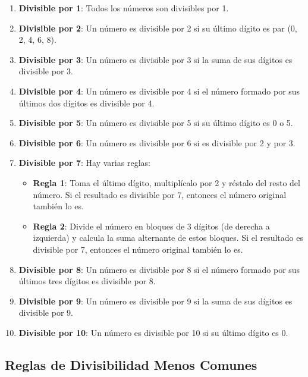 \begin{enumerate}
	\item \textbf{Divisible por 1}: Todos los números son divisibles por 1.
	\item \textbf{Divisible por 2}: Un número es divisible por 2 si su último dígito es par (0, 2, 4, 6, 8).
	\item \textbf{Divisible por 3}: Un número es divisible por 3 si la suma de sus dígitos es divisible por 3.
	\item \textbf{Divisible por 4}: Un número es divisible por 4 si el número formado por sus últimos dos dígitos es divisible por 4.
	\item \textbf{Divisible por 5}: Un número es divisible por 5 si su último dígito es 0 o 5.
	\item \textbf{Divisible por 6}: Un número es divisible por 6 si es divisible por 2 y por 3.
	\item \textbf{Divisible por 7}: Hay varias reglas:
	\begin{itemize}
		\item \textbf{Regla 1}: Toma el último dígito, multiplícalo por 2 y réstalo del resto del número. Si el resultado es divisible por 7, entonces el número original también lo es.
		\item \textbf{Regla 2}: Divide el número en bloques de 3 dígitos (de derecha a izquierda) y calcula la suma alternante de estos bloques. Si el resultado es divisible por 7, entonces el número original también lo es.
	\end{itemize}
	\item \textbf{Divisible por 8}: Un número es divisible por 8 si el número formado por sus últimos tres dígitos es divisible por 8.
	\item \textbf{Divisible por 9}: Un número es divisible por 9 si la suma de sus dígitos es divisible por 9.
	\item \textbf{Divisible por 10}: Un número es divisible por 10 si su último dígito es 0.
\end{enumerate}

\subsection{Reglas de Divisibilidad Menos Comunes}

